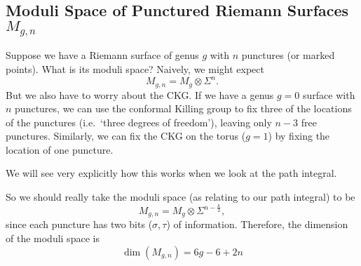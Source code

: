 \subsection{Moduli Space of Punctured Riemann Surfaces \texorpdfstring{$M_{g, n}$}{}}%
\label{sub:moduli_space_of_punctured_riemann_surfaces}

Suppose we have a Riemann surface of genus $g$ with $n$ punctures (or marked points). What is its moduli space?
Naively, we might expect
\begin{equation}
  M_{g, n} = M_g \otimes \Sigma^n.
\end{equation}
But we also have to worry about the CKG.
If we have a genus $g =0$ surface  with $n$ punctures, we can use the conformal Killing group to fix three of the locations of the punctures (i.e.~`three degrees of freedom'), leaving only $n-3$ free punctures.
Similarly, we can fix the CKG on the torus ($g = 1$) by fixing the location of one puncture. 
\begin{leftbar}
  We will see very explicitly how this works when we look at the path integral.
\end{leftbar}
So we should really take the moduli space (as relating to our path integral) to be
\begin{equation}
  M_{g, n} = M_g \otimes \Sigma^{n- \frac{\kappa}{2}},
\end{equation}
since each puncture has two bits ($\sigma, \tau$) of information.
Therefore, the dimension of the moduli space is
\begin{equation}
  \boxed{\dim(M_{g, n}) = 6 g - 6 + 2n}
\end{equation}

